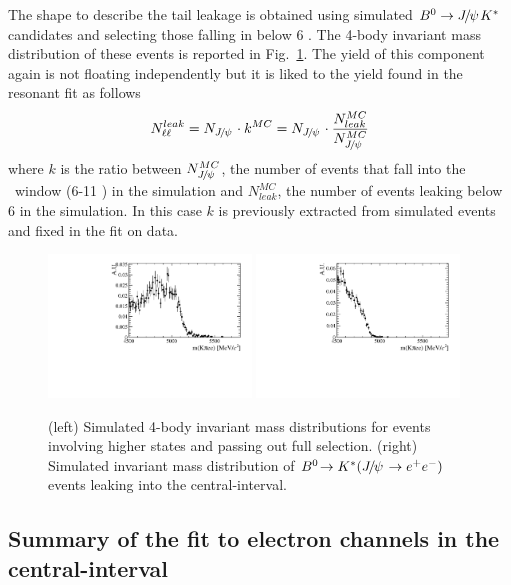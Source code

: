 The shape to describe the \jpsi tail leakage is obtained using simulated $\Bz\to\jpsi\Kstar$ candidates
and selecting those falling in \qsq below 6 \gevgevcccc. The 4-body invariant mass distribution
of these events is reported in Fig.~\ref{fig:RKst_rare_misreco_distrib}. The yield of this component
again is not floating independently but it is liked to the yield found in the resonant fit as follows
\begin{equation}
N_{\ell\ell}^{leak} = N_{\jpsi} \cdot k^{MC} = N_{\jpsi} \cdot \frac{N_{leak}^{MC}}{N_{\jpsi}^{MC}}
\end{equation}
where $k$ is the ratio between $N_{\jpsi}^{MC}$, the number of \jpsi events
that fall into the \jpsi ~\qsq window (6-11 \gevgevcccc) in the simulation
and $N_{leak}^{MC}$, the number of \jpsi events leaking below 6 \gevgevcccc in the simulation.
In this case $k$ is previously extracted from simulated events and fixed in the fit on data.

\begin{figure}[h!]
\centering
\includegraphics[width=0.48\textwidth]{RKst/figs/misreco/part_had.pdf}
\includegraphics[width=0.48\textwidth]{RKst/figs/misreco/jpsi_leakage.pdf}
\caption{(left) Simulated 4-body invariant mass distributions for events involving
higher \Kstar states and passing out full selection. (right) Simulated invariant mass
distribution of $\decay{\Bz}{\Kstar(\jpsi\to\ee)}$ events leaking into the central-\qsq interval.}
\label{fig:RKst_rare_misreco_distrib}
\end{figure}


\subsection{Summary of the fit to electron channels in the central-\qsq interval}

